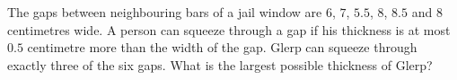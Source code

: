 The gaps between neighbouring bars of a jail window are $6$, $7$, $5.5$, $8$, $8.5$ and $8$ centimetres wide. A person can squeeze through a gap if his thickness is at most $0.5$ centimetre more than the width of the gap. Glerp can squeeze through exactly three of the six gaps. What is the largest possible thickness of Glerp?
